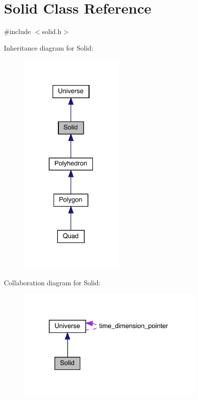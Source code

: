 \hypertarget{class_solid}{}\section{Solid Class Reference}
\label{class_solid}


{\ttfamily \#include $<$solid.\+h$>$}



Inheritance diagram for Solid\+:\nopagebreak
\begin{figure}[H]
\begin{center}
\leavevmode
\includegraphics[width=147pt]{class_solid__inherit__graph}
\end{center}
\end{figure}


Collaboration diagram for Solid\+:
\nopagebreak
\begin{figure}[H]
\begin{center}
\leavevmode
\includegraphics[width=263pt]{class_solid__coll__graph}
\end{center}
\end{figure}
